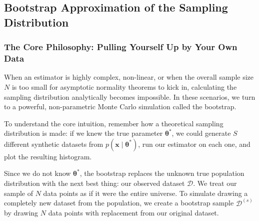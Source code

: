 \documentclass{article}
\begin{document}
\begin{table}[htbp]
\centering
\small
\renewcommand{\arraystretch}{1.4}
\caption{Operational Comparison of Predictive Frameworks on Sparse Logistical Datasets}
\label{tab:binary_scalar_comparison_v2}
\end{table}

\subsection{Bootstrap Approximation of the Sampling Distribution}

\subsubsection{The Core Philosophy: Pulling Yourself Up by Your Own Data}
When an estimator is highly complex, non-linear, or when the overall sample size $N$ is too small for asymptotic normality theorems to kick in, calculating the sampling distribution analytically becomes impossible. In these scenarios, we turn to a powerful, non-parametric Monte Carlo simulation called the bootstrap.

To understand the core intuition, remember how a theoretical sampling distribution is made: if we knew the true parameter $\boldsymbol{\theta}^*$, we could generate $S$ different synthetic datasets from $p(\mathbf{x} \mid \boldsymbol{\theta}^*)$, run our estimator on each one, and plot the resulting histogram. 

Since we do not know $\boldsymbol{\theta}^*$, the bootstrap replaces the unknown true population distribution with the next best thing: our observed dataset $\mathcal{D}$. We treat our sample of $N$ data points as if it were the entire universe. To simulate drawing a completely new dataset from the population, we create a bootstrap sample $\mathcal{D}^{(s)}$ by drawing $N$ data points with replacement from our original dataset. 
\end{document}
